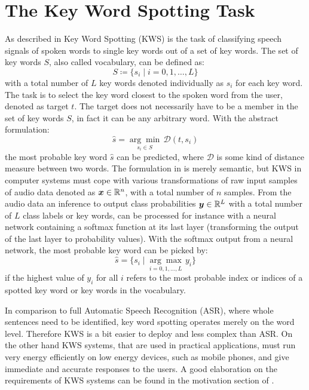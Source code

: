 
\section{The Key Word Spotting Task}\label{sec:intro_kws}
\thesisStateRevised
As described in  Key Word Spotting (KWS) is the task of classifying speech signals of spoken words to single key words out of a set of key words.
The set of key words $S$, also called vocabulary, can be defined as:
\begin{equation}\label{eq:intro_kws_dict}
	S \coloneqq \{s_i \mid i = 0, 1, \dots, L\}
\end{equation}
with a total number of $L$ key words denoted individually as $s_i$ for each key word.
The task is to select the key word closest to the spoken word from the user, denoted as target $t$.
The target does not necessarily have to be a member in the set of key words $S$, in fact it can be any arbitrary word.
With the abstract formulation:
\begin{equation}\label{eq:intro_kws_task}
	\hat{s} = \underset{s_i \in S}{\arg \min} \, \mathcal{D}(t, s_i)
\end{equation}
the most probable key word $\hat{s}$ can be predicted, where $\mathcal{D}$ is some kind of distance measure between two words.
The formulation in  is merely semantic, but KWS in computer systems must cope with various transformations of raw input samples of audio data denoted as $\bm{x} \in \mathbb{R}^n$, with a total number of $n$ samples.
From the audio data an inference to output class probabilities $\bm{y} \in \mathbb{R}^L$ with a total number of $L$ class labels or key words, can be processed for instance with a neural network containing a softmax function at its last layer (transforming the output of the last layer to probability values).
With the softmax output from a neural network, the most probable key word can be picked by:
\begin{equation}\label{eq:intro_kws_class}
	\hat{s} = \{s_i \mid \underset{i = 0, 1, \dots, L}{\arg \max} \, y_i\}
\end{equation}
if the highest value of $y_i$ for all $i$ refers to the most probable index or indices of a spotted key word or key words in the vocabulary.

In comparison to full Automatic Speech Recognition (ASR), where whole sentences need to be identified, key word spotting operates merely on the word level.
Therefore KWS is a bit easier to deploy and less complex than ASR.
On the other hand KWS systems, that are used in practical applications, must run very energy efficiently on low energy devices, such as mobile phones, and give immediate and accurate responses to the users. 
A good elaboration on the requirements of KWS systems can be found in the motivation section of \cite{Warden2018}.